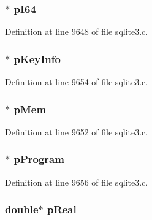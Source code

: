 \hypertarget{struct_vdbe_op_a1876426c76d65956460aaabcf0a96d8c}{}
\subsubsection[{p\+I64}]{$\ast$ p\+I64}\label{struct_vdbe_op_a1876426c76d65956460aaabcf0a96d8c}


Definition at line 9648 of file sqlite3.\+c.

\hypertarget{struct_vdbe_op_a2394c1e8402fe40753205256757b4165}{}
\subsubsection[{p\+Key\+Info}]{$\ast$ p\+Key\+Info}\label{struct_vdbe_op_a2394c1e8402fe40753205256757b4165}


Definition at line 9654 of file sqlite3.\+c.

\hypertarget{struct_vdbe_op_a7635916f8de63cb13cfe0579469bb583}{}
\subsubsection[{p\+Mem}]{$\ast$ p\+Mem}\label{struct_vdbe_op_a7635916f8de63cb13cfe0579469bb583}


Definition at line 9652 of file sqlite3.\+c.

\hypertarget{struct_vdbe_op_a3b92cb4ee986d1dfaf28a5ade854311c}{}
\subsubsection[{p\+Program}]{$\ast$ p\+Program}\label{struct_vdbe_op_a3b92cb4ee986d1dfaf28a5ade854311c}


Definition at line 9656 of file sqlite3.\+c.

\hypertarget{struct_vdbe_op_a4e34f091839ab042cf1d4ff2195a6b86}{}
\subsubsection[{p\+Real}]{\setlength{\rightskip}{0pt plus 5cm}double$\ast$ p\+Real}\label{struct_vdbe_op_a4e34f091839ab042cf1d4ff2195a6b86}


